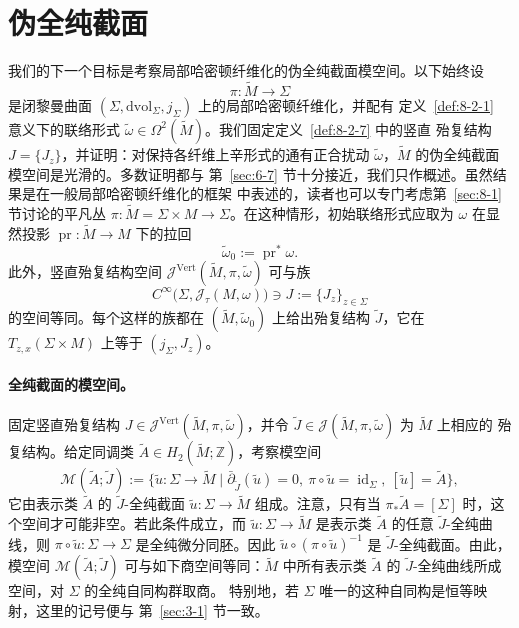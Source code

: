 
\section{伪全纯截面}\label{sec:8-3}

我们的下一个目标是考察局部哈密顿纤维化的伪全纯截面模空间。以下始终设
\[
  \pi:\widetilde M\longrightarrow\Sigma
\]
是闭黎曼曲面 $(\Sigma,\mathrm{dvol}_\Sigma,j_\Sigma)$ 上的局部哈密顿纤维化，并配有
定义~\ref{def:8-2-1} 意义下的联络形式
$\widetilde\omega\in\Omega^2(\widetilde M)$。我们固定定义~\ref{def:8-2-7} 中的竖直
殆复结构 $J=\{J_z\}$，并证明：对保持各纤维上辛形式的通有正合扰动
$\widetilde\omega$，$\widetilde M$ 的伪全纯截面模空间是光滑的。多数证明都与
第~\ref{sec:6-7} 节十分接近，我们只作概述。虽然结果是在一般局部哈密顿纤维化的框架
中表述的，读者也可以专门考虑第~\ref{sec:8-1} 节讨论的平凡丛
$\pi:\widetilde M=\Sigma\times M\to\Sigma$。在这种情形，初始联络形式应取为
$\omega$ 在显然投影 $\operatorname{pr}:\widetilde M\to M$ 下的拉回
\[
  \widetilde\omega_0:=\operatorname{pr}^*\omega.
\]
此外，竖直殆复结构空间
$\mathcal J^{\mathrm{Vert}}(\widetilde M,\pi,\widetilde\omega)$ 可与族
\[
  C^\infty\bigl(\Sigma,\mathcal J_\tau(M,\omega)\bigr)
  \ni J:=\{J_z\}_{z\in\Sigma}
\]
的空间等同。每个这样的族都在 $(\widetilde M,\widetilde\omega_0)$ 上给出殆复结构
$\widetilde J$，它在 $T_{z,x}(\Sigma\times M)$ 上等于 $(j_\Sigma,J_z)$。

\paragraph{全纯截面的模空间。}
固定竖直殆复结构
$J\in\mathcal J^{\mathrm{Vert}}(\widetilde M,\pi,\widetilde\omega)$，并令
$\widetilde J\in\mathcal J(\widetilde M,\pi,\widetilde\omega)$ 为 $\widetilde M$ 上相应的
殆复结构。给定同调类 $\widetilde A\in H_2(\widetilde M;\mathbb Z)$，考察模空间
\[
  \mathcal M(\widetilde A;\widetilde J)
  :=\bigl\{\widetilde u:\Sigma\to\widetilde M\mid
  \bar\partial_{\widetilde J}(\widetilde u)=0,\
  \pi\circ\widetilde u=\operatorname{id}_\Sigma,\
  [\widetilde u]=\widetilde A\bigr\},
\]
它由表示类 $\widetilde A$ 的 $\widetilde J$-全纯截面
$\widetilde u:\Sigma\to\widetilde M$ 组成。注意，只有当
$\pi_*\widetilde A=[\Sigma]$ 时，这个空间才可能非空。若此条件成立，而
$\widetilde u:\Sigma\to\widetilde M$ 是表示类 $\widetilde A$ 的任意
$\widetilde J$-全纯曲线，则
$\pi\circ\widetilde u:\Sigma\to\Sigma$ 是全纯微分同胚。因此
$\widetilde u\circ(\pi\circ\widetilde u)^{-1}$ 是 $\widetilde J$-全纯截面。由此，模空间
$\mathcal M(\widetilde A;\widetilde J)$ 可与如下商空间等同：$\widetilde M$ 中所有表示类
$\widetilde A$ 的 $\widetilde J$-全纯曲线所成空间，对 $\Sigma$ 的全纯自同构群取商。
特别地，若 $\Sigma$ 唯一的这种自同构是恒等映射，这里的记号便与
第~\ref{sec:3-1} 节一致。

